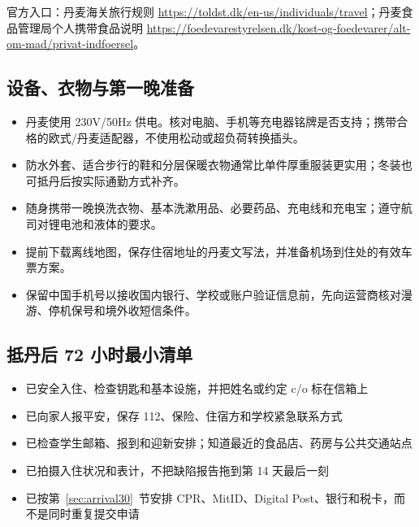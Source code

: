 官方入口：丹麦海关旅行规则 \url{https://toldst.dk/en-us/individuals/travel}；丹麦食品管理局个人携带食品说明 \url{https://foedevarestyrelsen.dk/kost-og-foedevarer/alt-om-mad/privat-indfoersel}。

\subsection{设备、衣物与第一晚准备}

\begin{itemize}[leftmargin=2em,itemsep=3pt]
  \item 丹麦使用 230V/50Hz 供电。核对电脑、手机等充电器铭牌是否支持；携带合格的欧式/丹麦适配器，不使用松动或超负荷转换插头。
  \item 防水外套、适合步行的鞋和分层保暖衣物通常比单件厚重服装更实用；冬装也可抵丹后按实际通勤方式补齐。
  \item 随身携带一晚换洗衣物、基本洗漱用品、必要药品、充电线和充电宝；遵守航司对锂电池和液体的要求。
  \item 提前下载离线地图，保存住宿地址的丹麦文写法，并准备机场到住处的有效车票方案。
  \item 保留中国手机号以接收国内银行、学校或账户验证信息前，先向运营商核对漫游、停机保号和境外收短信条件。
\end{itemize}

\subsection{抵丹后 72 小时最小清单}

\begin{itemize}[label=$\bigcirc$,leftmargin=2.2em,itemsep=3pt]
  \item 已安全入住、检查钥匙和基本设施，并把姓名或约定 c/o 标在信箱上
  \item 已向家人报平安，保存 112、保险、住宿方和学校紧急联系方式
  \item 已检查学生邮箱、报到和迎新安排；知道最近的食品店、药房与公共交通站点
  \item 已拍摄入住状况和表计，不把缺陷报告拖到第 14 天最后一刻
  \item 已按第~\ref{sec:arrival30}~节安排 CPR、MitID、Digital Post、银行和税卡，而不是同时重复提交申请
\end{itemize}

